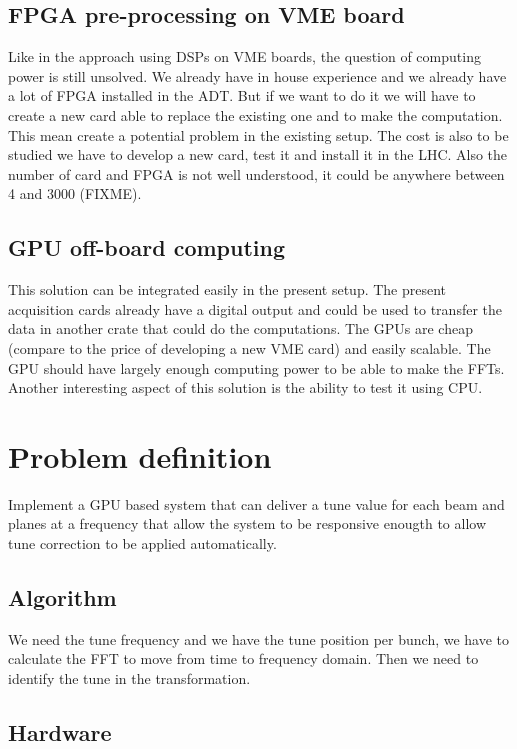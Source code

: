 \subsection{FPGA pre-processing on VME board}

Like in the approach using \glspl{DSP} on VME boards, the question of computing power is still unsolved. We already have in house experience and we already have a lot of \gls{FPGA} installed in the \gls{ADT}. But if we want to do it we will have to create a new card able to replace the existing one and to make the computation. This mean create a potential problem in the existing setup. The cost is also to be studied we have to develop a new card, test it and install it in the \gls{LHC}. Also the number of card and FPGA is not well understood, it could be anywhere between 4 and 3000 (FIXME).

\subsection{GPU off-board computing}

This solution can be integrated easily in the present setup. The present acquisition cards already have a digital output and could be used to transfer the data in another crate that could do the computations. The \glspl{GPU} are cheap (compare to the price of developing a new \gls{VME} card) and easily scalable. The \gls{GPU} should have largely enough computing power to be able to make the \glspl{FFT}. Another interesting aspect of this solution is the ability to test it using \gls{CPU}.

\section{Problem definition}

Implement a GPU based system that can deliver a tune value for each beam and planes at a frequency that allow the system to be responsive enougth to allow tune correction to be applied automatically. 

   \subsection{Algorithm}

   We need the tune frequency and we have the tune position per bunch, we have to calculate the FFT to move from time to frequency domain. Then we need to identify the tune in the transformation.

   \subsection{Hardware}

